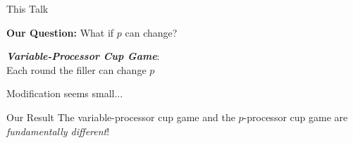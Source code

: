\documentclass[xcolor=x11names, svgnames, rgb]{beamer}
\newcommand{\defn}[1]       {{\textit{\textbf{\boldmath #1}}}}
\begin{document}
\begin{frame}[t]{This Talk}

  \textbf{Our Question:} What if $p$ can change?
\vspace{1cm}

  \defn{Variable-Processor Cup Game}: \\
  Each round the filler can change $p$ 

\vspace{1cm}
Modification seems small...
\end{frame}

\begin{frame}[t]{Our Result}
  \Large
  The variable-processor cup game and the
  $p$-processor cup game are \emph{fundamentally
  different}! 
\end{frame}
\end{document}
